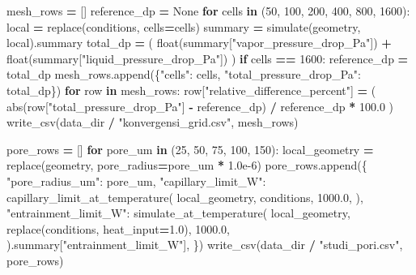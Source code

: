\documentclass[
  12pt,a4paper,oneside]{report}
\newenvironment{Shaded}{\begin{snugshade}}{\end{snugshade}}
\newcommand{\BuiltInTok}[1]{#1}
\newcommand{\ControlFlowTok}[1]{\textcolor[rgb]{0.13,0.29,0.53}{\textbf{#1}}}
\newcommand{\DecValTok}[1]{\textcolor[rgb]{0.00,0.00,0.81}{#1}}
\newcommand{\FloatTok}[1]{\textcolor[rgb]{0.00,0.00,0.81}{#1}}
\newcommand{\KeywordTok}[1]{\textcolor[rgb]{0.13,0.29,0.53}{\textbf{#1}}}
\newcommand{\NormalTok}[1]{#1}
\newcommand{\OperatorTok}[1]{\textcolor[rgb]{0.81,0.36,0.00}{\textbf{#1}}}
\newcommand{\StringTok}[1]{\textcolor[rgb]{0.31,0.60,0.02}{#1}}
\newcommand{\VariableTok}[1]{\textcolor[rgb]{0.00,0.00,0.00}{#1}}
\begin{document}
\begin{Shaded}
\begin{Highlighting}[]
\NormalTok{    mesh\_rows }\OperatorTok{=}\NormalTok{ []}
\NormalTok{    reference\_dp }\OperatorTok{=} \VariableTok{None}
    \ControlFlowTok{for}\NormalTok{ cells }\KeywordTok{in}\NormalTok{ (}\DecValTok{50}\NormalTok{, }\DecValTok{100}\NormalTok{, }\DecValTok{200}\NormalTok{, }\DecValTok{400}\NormalTok{, }\DecValTok{800}\NormalTok{, }\DecValTok{1600}\NormalTok{):}
\NormalTok{        local }\OperatorTok{=}\NormalTok{ replace(conditions, cells}\OperatorTok{=}\NormalTok{cells)}
\NormalTok{        summary }\OperatorTok{=}\NormalTok{ simulate(geometry, local).summary}
\NormalTok{        total\_dp }\OperatorTok{=}\NormalTok{ (}
            \BuiltInTok{float}\NormalTok{(summary[}\StringTok{"vapor\_pressure\_drop\_Pa"}\NormalTok{])}
            \OperatorTok{+} \BuiltInTok{float}\NormalTok{(summary[}\StringTok{"liquid\_pressure\_drop\_Pa"}\NormalTok{])}
\NormalTok{        )}
        \ControlFlowTok{if}\NormalTok{ cells }\OperatorTok{==} \DecValTok{1600}\NormalTok{:}
\NormalTok{            reference\_dp }\OperatorTok{=}\NormalTok{ total\_dp}
\NormalTok{        mesh\_rows.append(\{}\StringTok{"cells"}\NormalTok{: cells, }\StringTok{"total\_pressure\_drop\_Pa"}\NormalTok{: total\_dp\})}
    \ControlFlowTok{for}\NormalTok{ row }\KeywordTok{in}\NormalTok{ mesh\_rows:}
\NormalTok{        row[}\StringTok{"relative\_difference\_percent"}\NormalTok{] }\OperatorTok{=}\NormalTok{ (}
            \BuiltInTok{abs}\NormalTok{(row[}\StringTok{"total\_pressure\_drop\_Pa"}\NormalTok{] }\OperatorTok{{-}}\NormalTok{ reference\_dp)}
            \OperatorTok{/}\NormalTok{ reference\_dp }\OperatorTok{*} \FloatTok{100.0}
\NormalTok{        )}
\NormalTok{    write\_csv(data\_dir }\OperatorTok{/} \StringTok{"konvergensi\_grid.csv"}\NormalTok{, mesh\_rows)}

\NormalTok{    pore\_rows }\OperatorTok{=}\NormalTok{ []}
    \ControlFlowTok{for}\NormalTok{ pore\_um }\KeywordTok{in}\NormalTok{ (}\DecValTok{25}\NormalTok{, }\DecValTok{50}\NormalTok{, }\DecValTok{75}\NormalTok{, }\DecValTok{100}\NormalTok{, }\DecValTok{150}\NormalTok{):}
\NormalTok{        local\_geometry }\OperatorTok{=}\NormalTok{ replace(geometry, pore\_radius}\OperatorTok{=}\NormalTok{pore\_um }\OperatorTok{*} \FloatTok{1.0e{-}6}\NormalTok{)}
\NormalTok{        pore\_rows.append(\{}
            \StringTok{"pore\_radius\_um"}\NormalTok{: pore\_um,}
            \StringTok{"capillary\_limit\_W"}\NormalTok{: capillary\_limit\_at\_temperature(}
\NormalTok{                local\_geometry, conditions, }\FloatTok{1000.0}\NormalTok{,}
\NormalTok{            ),}
            \StringTok{"entrainment\_limit\_W"}\NormalTok{: simulate\_at\_temperature(}
\NormalTok{                local\_geometry, replace(conditions, heat\_input}\OperatorTok{=}\FloatTok{1.0}\NormalTok{), }\FloatTok{1000.0}\NormalTok{,}
\NormalTok{            ).summary[}\StringTok{"entrainment\_limit\_W"}\NormalTok{],}
\NormalTok{        \})}
\NormalTok{    write\_csv(data\_dir }\OperatorTok{/} \StringTok{"studi\_pori.csv"}\NormalTok{, pore\_rows)}


\end{Highlighting}
\end{Shaded}
\end{document}
